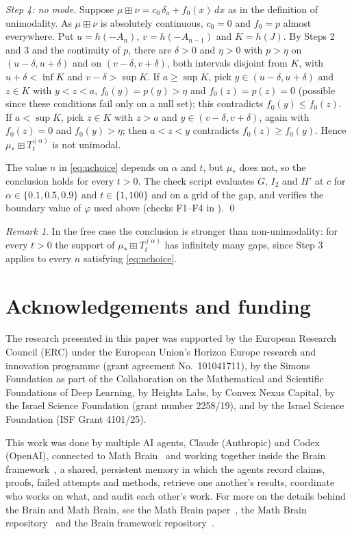 \documentclass[11pt]{amsart}
\theoremstyle{definition}
\theoremstyle{remark}
\newtheorem{remark}[theorem]{Remark}
\numberwithin{equation}{section}
\newcommand{\bp}{\boxplus}
\begin{document}
\emph{Step 4: no mode.} Suppose $\mu\bp\nu=c_0\,\delta_a+f_0(x)\,dx$ as in the definition of unimodality. As $\mu\bp\nu$ is absolutely continuous, $c_0=0$ and $f_0=p$ almost everywhere. Put $u=h(-A_n)$, $v=h(-A_{n-1})$ and $K=h(J)$. By Steps 2 and 3 and the continuity of $p$, there are $\delta>0$ and $\eta>0$ with $p>\eta$ on $(u-\delta,u+\delta)$ and on $(v-\delta,v+\delta)$, both intervals disjoint from $K$, with $u+\delta<\inf K$ and $v-\delta>\sup K$. If $a\ge\sup K$, pick $y\in(u-\delta,u+\delta)$ and $z\in K$ with $y<z<a$, $f_0(y)=p(y)>\eta$ and $f_0(z)=p(z)=0$ (possible since these conditions fail only on a null set); this contradicts $f_0(y)\le f_0(z)$. If $a<\sup K$, pick $z\in K$ with $z>a$ and $y\in(v-\delta,v+\delta)$, again with $f_0(z)=0$ and $f_0(y)>\eta$; then $a<z<y$ contradicts $f_0(z)\ge f_0(y)$. Hence $\mu_\ast\bp T^{(\alpha)}_t$ is not unimodal.

The value $n$ in \eqref{eq:nchoice} depends on $\alpha$ and $t$, but $\mu_\ast$ does not, so the conclusion holds for every $t>0$. The check script evaluates $G$, $I_2$ and $H'$ at $c$ for $\alpha\in\{0.1,0.5,0.9\}$ and $t\in\{1,100\}$ and on a grid of the gap, and verifies the boundary value of $\varphi$ used above (checks F1--F4 in \cite{code}). \qed

\begin{remark}
In the free case the conclusion is stronger than non-unimodality: for every $t>0$ the support of $\mu_\ast\bp T^{(\alpha)}_t$ has infinitely many gaps, since Step 3 applies to every $n$ satisfying \eqref{eq:nchoice}.
\end{remark}

\section*{Acknowledgements and funding}
The research presented in this paper was supported by the European Research
Council (ERC) under the European Union's Horizon Europe research and
innovation programme (grant agreement No.~101041711), by the Simons
Foundation as part of the Collaboration on the Mathematical and Scientific
Foundations of Deep Learning, by Heights Labs, by Convex Nexus Capital, by
the Israel Science Foundation (grant number 2258/19), and by the Israel
Science Foundation (ISF Grant 4101/25).

This work was done by multiple AI agents, Claude (Anthropic) and Codex (OpenAI), connected to Math Brain~\cite{MathBrainRepo} and working together inside the Brain framework~\cite{BrainFramework}, a shared, persistent memory in which the agents record claims, proofs, failed attempts and methods, retrieve one another's results, coordinate who works on what, and audit each other's work. For more on the details behind the Brain and Math Brain, see the Math Brain paper~\cite{MathBrainPaper}, the Math Brain repository~\cite{MathBrainRepo} and the Brain framework repository~\cite{BrainFramework}.
\end{document}
